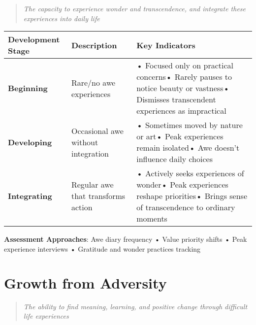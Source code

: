 \documentclass[
  a4paper,
]{report}
\begin{document}
\begin{quote}
\emph{The capacity to experience wonder and transcendence, and integrate
these experiences into daily life}
\end{quote}

\begin{longtable}[]{@{}
  >{\raggedright\arraybackslash}p{}
  >{\raggedright\arraybackslash}p{}
  >{\raggedright\arraybackslash}p{}@{}}
\toprule\noalign{}
\begin{minipage}[b]{\linewidth}\raggedright
Development Stage
\end{minipage} & \begin{minipage}[b]{\linewidth}\raggedright
Description
\end{minipage} & \begin{minipage}[b]{\linewidth}\raggedright
Key Indicators
\end{minipage} \\
\midrule\noalign{}
\endhead
\bottomrule\noalign{}
\endlastfoot
\textbf{Beginning} & Rare/no awe experiences & • Focused only on
practical concerns• Rarely pauses to notice beauty or vastness•
Dismisses transcendent experiences as impractical \\
\textbf{Developing} & Occasional awe without integration & • Sometimes
moved by nature or art• Peak experiences remain isolated• Awe doesn't
influence daily choices \\
\textbf{Integrating} & Regular awe that transforms action & • Actively
seeks experiences of wonder• Peak experiences reshape priorities• Brings
sense of transcendence to ordinary moments \\
\end{longtable}

\textbf{Assessment Approaches}: Awe diary frequency • Value priority
shifts • Peak experience interviews • Gratitude and wonder practices
tracking

\section{Growth from Adversity}

\begin{quote}
\emph{The ability to find meaning, learning, and positive change through
difficult life experiences}
\end{quote}
\end{document}
